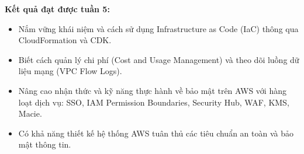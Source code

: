 \vspace{0.5em}\noindent\textbf{Kết quả đạt được tuần
5:}\par

\begin{itemize}
\tightlist
\item
  Nắm vững khái niệm và cách sử dụng Infrastructure as Code (IaC) thông
  qua CloudFormation và CDK.
\item
  Biết cách quản lý chi phí (Cost and Usage Management) và theo dõi
  luồng dữ liệu mạng (VPC Flow Logs).
\item
  Nâng cao nhận thức và kỹ năng thực hành về bảo mật trên AWS với hàng
  loạt dịch vụ: SSO, IAM Permission Boundaries, Security Hub, WAF, KMS,
  Macie.
\item
  Có khả năng thiết kế hệ thống AWS tuân thủ các tiêu chuẩn an toàn và
  bảo mật thông tin.
\end{itemize}
